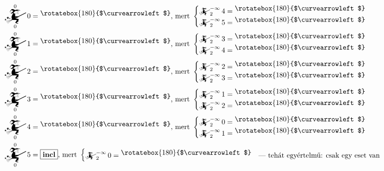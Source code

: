 \documentclass{article}
\newcommand{\nothing}{\text{\raisebox{0.4em}{\rotatebox{180}{$\curvearrowleft$}}}}%
\newcommand{\just}[1]{\boxed{#1}}%
\newcommand{\incl}{\mathbf{incl}}
\newcommand{\mainfun}[3]{\mathwitch_{#1}^{#2}#3}
\begin{document}
	\begin{align*}
		\mainfun0{0}0  &= \nothing    \text{, mert }\begin{cases}\mainfun2{-\infty}4 = \nothing\\\mainfun2{-\infty}5 = \nothing&\end{cases} \\
		\mainfun0{0}1  &= \nothing    \text{, mert }\begin{cases}\mainfun2{-\infty}3 = \nothing\\\mainfun2{-\infty}4 = \nothing&\end{cases} \\
		\mainfun0{0}2  &= \nothing    \text{, mert }\begin{cases}\mainfun2{-\infty}2 = \nothing\\\mainfun2{-\infty}3 = \nothing&\end{cases} \\
		\mainfun0{0}3  &= \nothing    \text{, mert }\begin{cases}\mainfun2{-\infty}1 = \nothing\\\mainfun2{-\infty}2 = \nothing&\end{cases} \\
		\mainfun0{0}4  &= \nothing    \text{, mert }\begin{cases}\mainfun2{-\infty}0 = \nothing\\\mainfun2{-\infty}1 = \nothing&\end{cases} \\
		\mainfun0{0}5  &= \just \incl \text{, mert }\begin{cases}\mainfun2{-\infty}0 = \nothing&\text{--- tehát egyértelmű: csak egy eset van}\end{cases}
	\end{align*}
\end{document}
